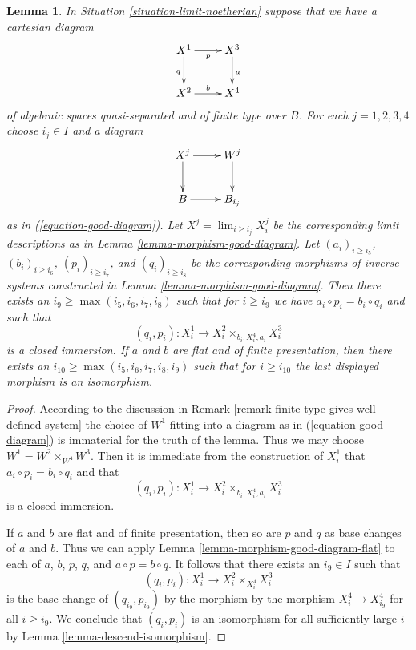 \documentclass{stacks-project}
\theoremstyle{plain}
\newtheorem{lemma}[subsection]{Lemma}
\theoremstyle{definition}
\theoremstyle{remark}
\numberwithin{equation}{subsection}
\def\lim{\mathop{\mathrm{lim}}\nolimits}
\begin{document}
\begin{lemma}
\label{lemma-good-diagram-fibre-product}
In Situation \ref{situation-limit-noetherian} suppose that we have a
cartesian diagram
$$
\xymatrix{
X^1 \ar[r]_p \ar[d]_q & X^3 \ar[d]^a \\
X^2 \ar[r]^b & X^4
}
$$
of algebraic spaces quasi-separated and of finite type over $B$.
For each $j = 1, 2, 3, 4$ choose $i_j \in I$ and a diagram
$$
\xymatrix{
X^j \ar[r] \ar[d] & W^j \ar[d] \\
B \ar[r] & B_{i_j}
}
$$
as in (\ref{equation-good-diagram}). Let
$X^j = \lim_{i \geq i_j} X^j_i$ be the corresponding limit descriptions
as in Lemma \ref{lemma-morphism-good-diagram}.
Let $(a_i)_{i \geq i_5}$, $(b_i)_{i \geq i_6}$, $(p_i)_{i \geq i_7}$, and
$(q_i)_{i \geq i_8}$ be the corresponding morphisms of inverse systems
constructed in Lemma \ref{lemma-morphism-good-diagram}. Then there exists an
$i_9 \geq \max(i_5, i_6, i_7, i_8)$ such that for $i \geq i_9$ we have
$a_i \circ p_i = b_i \circ q_i$ and such that
$$
(q_i, p_i) : X^1_i \longrightarrow X^2_i \times_{b_i, X^4_i, a_i} X^3_i
$$
is a closed immersion.
If $a$ and $b$ are flat and of finite presentation, then there exists an
$i_{10} \geq \max(i_5, i_6, i_7, i_8, i_9)$ such that for $i \geq i_{10}$
the last displayed morphism is an isomorphism.
\end{lemma}

\begin{proof}
According to the discussion in
Remark \ref{remark-finite-type-gives-well-defined-system}
the choice of $W^1$ fitting into a diagram as in
(\ref{equation-good-diagram}) is immaterial for the truth of
the lemma. Thus we may choose $W^1 = W^2 \times_{W^4} W^3$.
Then it is immediate from the construction of $X^1_i$ that 
$a_i \circ p_i = b_i \circ q_i$ and that
$$
(q_i, p_i) : X^1_i \longrightarrow X^2_i \times_{b_i, X^4_i, a_i} X^3_i
$$
is a closed immersion.

\medskip\noindent
If $a$ and $b$ are flat and of finite presentation, then so are
$p$ and $q$ as base changes of $a$ and $b$. Thus we can apply
Lemma \ref{lemma-morphism-good-diagram-flat}
to each of $a$, $b$, $p$, $q$, and $a \circ p = b \circ q$.
It follows that there exists an $i_9 \in I$ such that
$$
(q_i, p_i) : X^1_i \to X^2_i \times_{X^4_i} X^3_i
$$
is the base change of $(q_{i_9}, p_{i_9})$ by the morphism
by the morphism $X^4_i \to X^4_{i_9}$ for all $i \geq i_9$.
We conclude that $(q_i, p_i)$ is an isomorphism for all sufficiently
large $i$ by Lemma \ref{lemma-descend-isomorphism}.
\end{proof}
\end{document}
